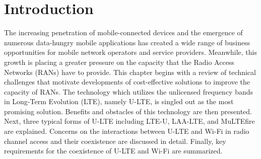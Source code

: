 %
%
%
\chapter{Introduction}
\label{intro} 


The increasing penetration of mobile-connected devices and the emergence of numerous data-hungry mobile applications has created a wide range of business opportunities for mobile network operators and service providers. Meanwhile, this growth is placing a greater pressure on the capacity that the Radio Access Networks (RANs) have to provide. This chapter begins with a review of technical challenges that motivate developments of cost-effective solutions to improve the capacity of RANs. The technology which utilizes the unlicensed frequency bands in Long-Term Evolution (LTE), namely U-LTE, is singled out as the most promising solution. Benefits and obstacles of this technology are then presented. Next, three typical forms of U-LTE including LTE-U, LAA-LTE, and MuLTEfire are explained. Concerns on the interactions between U-LTE and Wi-Fi in radio channel access and their coexistence are discussed in detail. Finally, key requirements for the coexistence of U-LTE and Wi-Fi are summarized.


